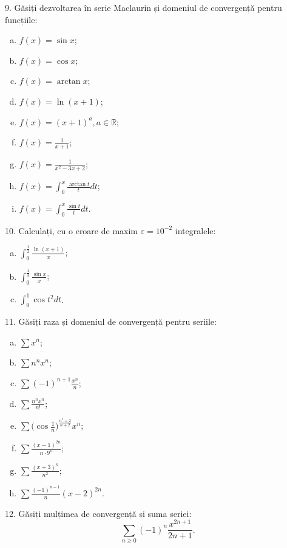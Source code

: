 \documentclass[11pt,a4paper]{article}
\newcommand\ds{\displaystyle}
\newcommand\RR{\mathbb{R}}
\theoremstyle{dotless}
\theoremstyle{dotlessdr}
\begin{document}
9. Găsiți dezvoltarea în serie Maclaurin și domeniul de convergență pentru funcțiile:
\begin{enumerate}[(a)]
\item $f(x) = \sin x$;
\item $f(x) = \cos x$;
\item $f(x) = \arctan x$;
\item $f(x) = \ln(x + 1)$;
\item $f(x) = (x + 1)^a, a \in \RR$;
\item $f(x) = \frac{1}{x + 1}$;
\item $f(x) = \frac{1}{x^2 - 3x + 2}$;
\item $f(x) = \ds\int_0^x \frac{\arctan t}{t} dt$;
\item $f(x) = \ds\int_0^x \frac{\sin t}{t} dt$.
\end{enumerate}

\vspace{1cm}

10. Calculați, cu o eroare de maxim $\varepsilon = 10^{-2}$ integralele:
\begin{enumerate}[(a)]
\item $\ds\int_0^{\frac{1}{2}} \frac{\ln (x + 1)}{x}$;
\item $\ds\int_0^{\frac{1}{3}} \frac{\sin x}{x}$;
\item $\ds\int_0^1 \cos t^2 dt$.
\end{enumerate}

\vspace{1cm}

11. Găsiți raza și domeniul de convergență pentru seriile:
\begin{enumerate}[(a)]
\item $\sum x^n$;
\item $\sum n^n x^n$;
\item $\sum (-1)^{n + 1} \frac{x^n}{n}$;
\item $\sum \frac{n^n x^n}{n!}$;
\item $\sum \Big( \cos \frac{1}{n} \Big)^{\frac{n^2 + 2}{n + 2}} x^n$;
\item $\sum \frac{(x - 1)^{2n}}{n \cdot 9^n}$;
\item $\sum \frac{(x + 3)^n}{n^2}$;
\item $\sum \frac{(-1)^{n - 1}}{n} (x - 2)^{2n}$.
\end{enumerate}

\vspace{1cm}

12. Găsiți mulțimea de convergență și suma seriei:
\[
  \sum_{n \geq 0} (-1)^n \frac{x^{2n+1}}{2n + 1}.
\]
\end{document}
